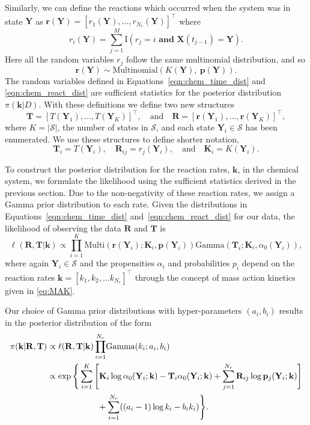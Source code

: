 \documentclass[final]{siamltex}
\begin{document}
Similarly, we can define the reactions which occurred when the system was in state $\mathbf{Y}$ as $\mathbf{r}(\mathbf{Y}) = [r_1(\mathbf{Y}), \ldots, r_{N_r}(\mathbf{Y})]^\top$ where
\[
	r_i(\mathbf{Y}) = \sum\limits_{j=1}^M \text{I}(r_j = i \textbf{ and }\mathbf{X}(t_{j-1}) = \mathbf{Y}).
\]
Here all the random variables $r_j$ follow the same multinomial distribution, and so
\begin{equation}\label{eqn:chem_react_dist}
	\mathbf{r}(\mathbf{Y}) \sim \text{Multinomial}(K(\mathbf{Y}),~\mathbf{p}(\mathbf{Y})). 
\end{equation}
The random variables defined in Equations~\eqref{eqn:chem_time_dist} and \eqref{eqn:chem_react_dist} are sufficient statistics for the posterior distribution $\pi(\mathbf{k}|D)$. With these definitions we define two new structures
\[
	\mathbf{T} = [T(\mathbf{Y}_1), \dots, T(\mathbf{Y}_K)]^\top, \quad \text{and} \quad \mathbf{R} = [\mathbf{r}(\mathbf{Y}_1), \dots, \mathbf{r}(\mathbf{Y}_K)]^\top,
\]
where $K = |\mathcal{S}|$, the number of states in $\mathcal{S}$, and each state $\mathbf{Y}_i \in \mathcal{S}$ has been enumerated. We use these structures to define shorter notation,
\[
	\mathbf{T}_i = T(\mathbf{Y}_i), \quad \mathbf{R}_{ij} = r_j(\mathbf{Y}_i), \quad \text{and} \quad \mathbf{K}_i = K(\mathbf{Y}_i).
\]

To construct the posterior distribution for the reaction rates, $\mathbf{k}$, in the chemical system, we formulate the likelihood using the sufficient statistics derived in the previous section. Due to the non-negativity of these reaction rates, we assign a Gamma prior distribution to each rate. Given the distributions in Equations~\eqref{eqn:chem_time_dist} and~\eqref{eqn:chem_react_dist} for our data, the likelihood of observing the data $\mathbf{R}$ and $\mathbf{T}$ is
\[
	\ell(\mathbf{R}, \mathbf{T}|\mathbf{k}) \propto \prod\limits_{i=1}^K \text{Multi}(\mathbf{r}(\mathbf{Y}_i); \mathbf{K}_i, \mathbf{p}(\mathbf{Y}_i))\text{Gamma}(\mathbf{T}_i; \mathbf{K}_i, \alpha_0(\mathbf{Y}_i)),
\]
where again $\mathbf{Y}_i \in \mathcal{S}$ and the propensities
$\alpha_i$ and probabilities $p_i$ depend on the reaction rates
$\mathbf{k} = [k_1, k_2, \ldots k_{N_r}]^\top$ through the concept of
mass action kinetics given in \eqref{eq:MAK}.

Our choice of Gamma prior distributions with hyper-parameters $(a_i, b_i)$ results in the posterior distribution of the form
\begin{align}
	\pi(\mathbf{k}|\mathbf{R}, \mathbf{T}) &\propto \ell(\mathbf{R}, \mathbf{T}|\mathbf{k})
	\prod_{i=1}^{N_r} \! \text{Gamma}(k_i; a_i, b_i) \notag \\
		&\propto \exp\Bigg\{\sum\limits_{i=1}^K \Bigg[
				\mathbf{K}_i\log \alpha_0(\mathbf{Y}_i; \mathbf{k}) - \mathbf{T}_i\alpha_0(\mathbf{Y}_i; \mathbf{k}) %
				+\sum_{j=1}^{N_r} \mathbf{R}_{ij}\log\mathbf{p}_j(\mathbf{Y}_i; \mathbf{k})
			\Bigg]  \notag\\
		&	\qquad\qquad\qquad{} + \sum_{i=1}^{N_r} ((a_i-1)\log k_i - b_ik_i)\Bigg\}. \label{eqn:chem_posterior}
\end{align}
\end{document}
